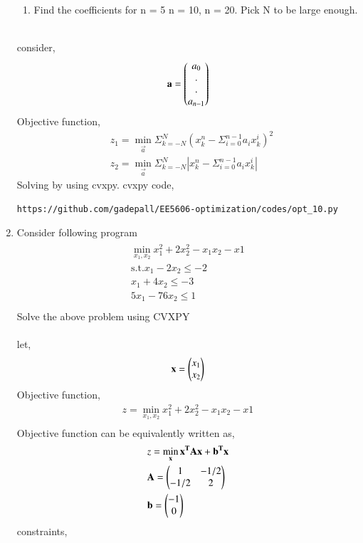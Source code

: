 \documentclass[journal,12pt,twocolumn]{IEEEtran}
\begin{document}
\begin{enumerate}
\begin{enumerate}
\item Find the coefficients for n = 5 n = 10, n = 20. Pick N to be large enough.
\end {enumerate}
\solution\\
consider,
\begin{align}
\mathbf{a}=\begin{pmatrix}a_0\\.\\.\\a_{n-1}\end{pmatrix}
\end{align}
Objective function,
\begin{align}
&z_1= \min_{\vec{a}}\Sigma_{k=-N}^{N}(x_k^n-\Sigma_{i=0}^{n-1}a_ix_k^i)^2 \\
&z_2=\min_{\vec{a}}\Sigma_{k=-N}^{N}|x_k^n-\Sigma_{i=0}^{n-1}a_ix_k^i| 
\end{align}
Solving by using cvxpy.
cvxpy code,
\begin{lstlisting}
https://github.com/gadepall/EE5606-optimization/codes/opt_10.py
\end{lstlisting} 
\item Consider following program
\begin{align} 
\begin{aligned}
\min_{x_1,x_2} x_1^2+2x_2^2-x_1x_2-x1\\
\textrm{s.t.} x_1-2x_2\leq -2\\
   x_1+4x_2\leq -3  \\
   5x_1 -76 x_2 \leq 1\\
\end{aligned}
\end{align}
Solve the above problem using CVXPY\\
\solution\\
let,
\begin{align}
\mathbf{x}= \begin{pmatrix}x_1\\x_2\end{pmatrix}
\end{align}
Objective function,
\begin{align}
z =\min_{x_1,x_2} x_1^2+2x_2^2-x_1x_2-x1\\
\end{align} 
Objective function can be equivalently written as,
\begin{align}
&z= \min_{\mathbf{x}}\mathbf{x^TAx}+\mathbf{b^Tx}\\
&\mathbf{A}=\begin{pmatrix}1&-1/2\\-1/2&2\end{pmatrix}\\
&\mathbf{b}=\begin{pmatrix}-1\\0\end{pmatrix}
\end{align}
constraints,
\begin{align}

\end{align}
\end{enumerate}
\end{document}
